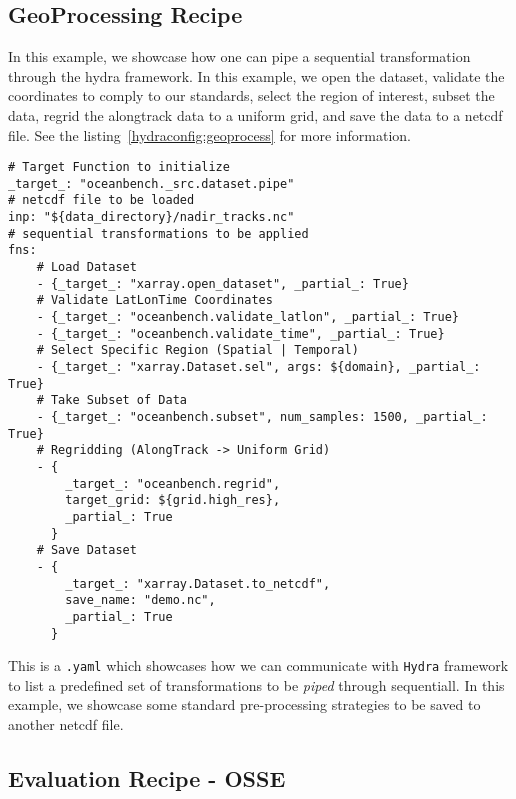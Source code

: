 \newpage
\subsection{GeoProcessing Recipe} \label{sec:hydra_geoprocess_task}

In this example, we showcase how one can pipe a sequential transformation through the hydra framework. In this example, we open the dataset, validate the coordinates to comply to our standards, select the region of interest, subset the data, regrid the alongtrack data to a uniform grid, and save the data to a netcdf file. See the listing~\ref{hydraconfig:geoprocess} for more information.


\begin{listing}[ht!]
\begin{verbatim}
# Target Function to initialize
_target_: "oceanbench._src.dataset.pipe"
# netcdf file to be loaded
inp: "${data_directory}/nadir_tracks.nc"
# sequential transformations to be applied
fns:
    # Load Dataset
    - {_target_: "xarray.open_dataset", _partial_: True}
    # Validate LatLonTime Coordinates
    - {_target_: "oceanbench.validate_latlon", _partial_: True}
    - {_target_: "oceanbench.validate_time", _partial_: True}
    # Select Specific Region (Spatial | Temporal)
    - {_target_: "xarray.Dataset.sel", args: ${domain}, _partial_: True}
    # Take Subset of Data
    - {_target_: "oceanbench.subset", num_samples: 1500, _partial_: True}
    # Regridding (AlongTrack -> Uniform Grid)
    - {
        _target_: "oceanbench.regrid", 
        target_grid: ${grid.high_res}, 
        _partial_: True
      }
    # Save Dataset
    - {
        _target_: "xarray.Dataset.to_netcdf", 
        save_name: "demo.nc", 
        _partial_: True
      }
\end{verbatim}
\label{hydraconfig:geoprocess}
\caption{This is a \texttt{.yaml} which showcases how we can communicate with \texttt{Hydra} framework to list a predefined set of transformations to be \textit{piped} through sequentiall. In this example, we showcase some standard pre-processing strategies to be saved to another netcdf file.}
\end{listing}




\newpage
\subsection{Evaluation Recipe - OSSE} \label{sec:hydra_evaluation_task}

